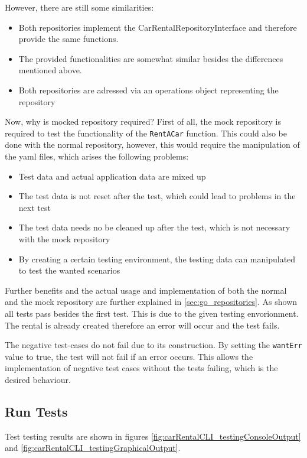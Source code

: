 However, there are still some similarities:
\begin{itemize}
      \item Both repositories implement the CarRentalRepositoryInterface and therefore provide the same functions.
      \item The provided functionalities are somewhat similar besides the differences mentioned above.
      \item Both repositories are adressed via an operations object representing the repository
\end{itemize}

Now, why is mocked repository required?
First of all, the mock repository is required to test the functionality of the \texttt{RentACar} function.
This could also be done with the normal repository, however, this would require the manipulation of the yaml files, which arises the following problems:
\begin{itemize}
      \item Test data and actual application data are mixed up
      \item The test data is not reset after the test, which could lead to problems in the next test
      \item The test data needs no be cleaned up after the test, which is not necessary with the mock repository
      \item By creating a certain testing environment, the testing data can manipulated to test the wanted scenarios
\end{itemize}

Further benefits and the actual usage and implementation of both the normal and the mock repository are further explained in \ref{sec:go_repositories}.
As shown all tests pass besides the first test.
This is due to the given testing envorionment.
The rental is already created therefore an error will occur and the test fails.

The negative test-cases do not fail due to its construction.
By setting the \texttt{wantErr} value to true, the test will not fail if an error occurs.
This allows the implementation of negative test cases without the tests failing, which is the desired behaviour.

\subsection*{Run Tests}
Test testing results are shown in figures \ref*{fig:carRentalCLI_testingConsoleOutput} and \ref*{fig:carRentalCLI_testingGraphicalOutput}.

